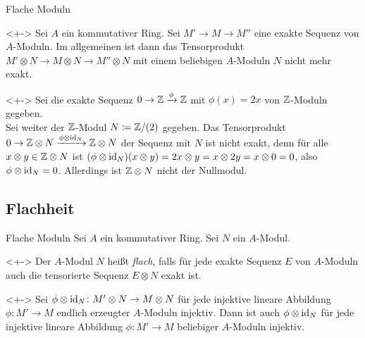 \begin{frame}{Flache Moduln}
	\begin{remark}<+->
		Sei \(A\) ein kommutativer Ring.
		Sei \(M' \to M \to M''\) eine exakte Sequenz von
		\(A\)-Moduln. Im allgemeinen ist dann das Tensorprodukt \(M' \otimes N \to M \otimes N
		\to M'' \otimes N\) mit einem beliebigen \(A\)-Moduln \(N\) nicht mehr exakt.
	\end{remark}
	\begin{example}<+->
		Sei die exakte Sequenz \(0 \to \mathbb Z \xrightarrow\phi \mathbb Z\) mit \(\phi(x) = 2 x\)
		von \(\mathbb Z\)-Moduln gegeben.
		\\
		Sei weiter der \(\mathbb Z\)-Modul \(N \coloneqq \mathbb Z/(2)\) gegeben.
		Das Tensorprodukt \(0 \to \mathbb Z \otimes N \xrightarrow{\phi \otimes \operatorname{id}_N} \mathbb Z \otimes N\)
		der Sequenz mit \(N\) ist nicht exakt, denn für alle \(x \otimes y \in \mathbb Z \otimes N\) ist
		\((\phi \otimes \operatorname{id}_N)(x \otimes y) = 2x \otimes y = x \otimes 2y = x \otimes 0 = 0\), also
		\(\phi \otimes \operatorname{id}_N = 0\). Allerdings ist \(\mathbb Z \otimes N\) nicht der Nullmodul.
	\end{example}
\end{frame}

\subsection{Flachheit}

\begin{frame}{Flache Moduln}
	Sei \(A\) ein kommutativer Ring. Sei \(N\) ein \(A\)-Modul.
	\begin{definition}<+->
		Der \(A\)-Modul \(N\) heißt \emph{flach}, falls für jede exakte Sequenz \(E\) von \(A\)-Moduln
		auch die tensorierte Sequenz \(E \otimes N\) exakt ist.
	\end{definition}
	\begin{lemma}<+->
		Sei \(\phi \otimes \operatorname{id}_N\colon M' \otimes N \to M \otimes N\) für jede injektive lineare Abbildung
		\(\phi\colon M' \to M\) endlich erzeugter \(A\)-Moduln injektiv. Dann ist auch
		\(\phi \otimes \operatorname{id}_N\) für jede injektive lineare Abbildung \(\phi\colon M' \to M\) beliebiger
		\(A\)-Moduln injektiv.
	\end{lemma}
\end{frame}

